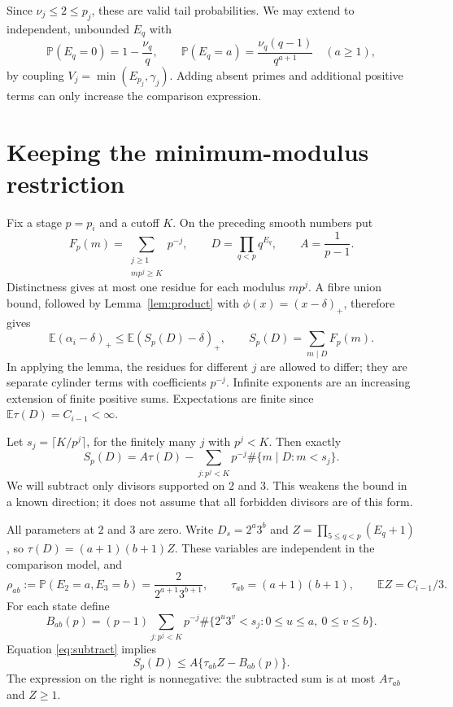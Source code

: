 \documentclass[11pt]{article}
\newcommand{\E}{\mathbb E}
\newcommand{\Pp}{\mathbb P}
\newcommand{\pos}[1]{(#1)_+}
\begin{document}
Since $\nu_j\leq2\leq p_j$, these are valid tail probabilities. We may
extend to independent, unbounded $E_q$ with
\begin{equation}\label{eq:exponent}
 \Pp(E_q=0)=1-\frac{\nu_q}{q},\qquad
 \Pp(E_q=a)=\frac{\nu_q(q-1)}{q^{a+1}}\quad(a\geq1),
\end{equation}
by coupling $V_j=\min(E_{p_j},\gamma_j)$. Adding absent primes and additional
positive terms can only increase the comparison expression.

\section{Keeping the minimum-modulus restriction}
Fix a stage $p=p_i$ and a cutoff $K$. On the preceding smooth numbers put
\[
 F_p(m)=\sum_{\substack{j\geq1\\mp^j\geq K}}p^{-j},\qquad
 D=\prod_{q<p}q^{E_q},\qquad A=\frac1{p-1}.
\]
Distinctness gives at most one residue for each modulus $mp^j$.
A fibre union bound, followed by Lemma~\ref{lem:product} with
$\phi(x)=(x-\delta)_+$, therefore gives
\begin{equation}\label{eq:full}
 \E\pos{\alpha_i-\delta}\leq
 \E\pos{S_p(D)-\delta},\qquad
 S_p(D)=\sum_{m\mid D}F_p(m).
\end{equation}
In applying the lemma, the residues for different $j$ are allowed to differ;
they are separate cylinder terms with coefficients $p^{-j}$. Infinite
exponents are an increasing extension of finite positive sums. Expectations
are finite since $\E\tau(D)=C_{i-1}<\infty$.

Let $s_j=\lceil K/p^j\rceil$, for the finitely many $j$ with $p^j<K$.
Then exactly
\begin{equation}\label{eq:subtract}
 S_p(D)=A\tau(D)-\sum_{j:p^j<K}p^{-j}
                    \#\{m\mid D:m<s_j\}.
\end{equation}
We will subtract only divisors supported on $2$ and $3$. This weakens the
bound in a known direction; it does not assume that all forbidden divisors
are of this form.

All parameters at $2$ and $3$ are zero. Write
$D_s=2^a3^b$ and
$Z=\prod_{5\leq q<p}(E_q+1)$, so $\tau(D)=(a+1)(b+1)Z$.
These variables are independent in the comparison model, and
\[
 \rho_{ab}:=\Pp(E_2=a,E_3=b)
     =\frac{2}{2^{a+1}3^{b+1}},\qquad
 \tau_{ab}=(a+1)(b+1),\qquad \E Z=C_{i-1}/3.
\]
For each state define
\[
 B_{ab}(p)=(p-1)\sum_{j:p^j<K}p^{-j}
       \#\{2^u3^v<s_j:0\leq u\leq a,\ 0\leq v\leq b\}.
\]
Equation \eqref{eq:subtract} implies
\[
 S_p(D)\leq A\{\tau_{ab}Z-B_{ab}(p)\}.
\]
The expression on the right is nonnegative: the subtracted sum is at most
$A\tau_{ab}$ and $Z\geq1$.
\end{document}
